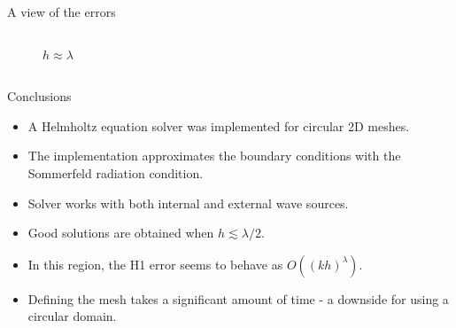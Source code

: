 \documentclass{beamer}
\begin{document}
\begin{frame}{A view of the errors}
\begin{columns}
\begin{column}{0.5\textwidth}
\begin{center}
\begin{figure}
    \caption{$h \approx \lambda$}
    \end{figure}
    \end{center}
  \end{column}
  \end{columns}
\end{frame}

\begin{frame}{Conclusions}
 \begin{itemize}
  \item A Helmholtz equation solver was implemented for circular 2D meshes.
  \item The implementation approximates the boundary conditions with the Sommerfeld radiation condition.
  \item Solver works with both internal and external wave sources.
  \item Good solutions are obtained when $h \lesssim \lambda/2$.
  \item In this region, the H1 error seems to behave as $O( (kh)^\lambda)$.
  \item Defining the mesh takes a significant amount of time - a downside for using a circular domain.
 \end{itemize}

\end{frame}
\end{document}
